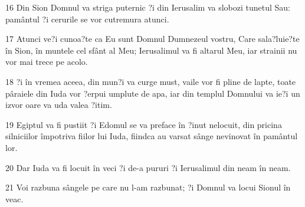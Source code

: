 \par 16 Din Sion Domnul va striga puternic ?i din Ierusalim va slobozi tunetul Sau: pamântul ?i cerurile se vor cutremura atunci.
\par 17 Atunci ve?i cunoa?te ca Eu sunt Domnul Dumnezeul vostru, Care sala?luie?te în Sion, în muntele cel sfânt al Meu; Ierusalimul va fi altarul Meu, iar strainii nu vor mai trece pe acolo.
\par 18 ?i în vremea aceea, din mun?i va curge must, vaile vor fi pline de lapte, toate pâraiele din Iuda vor ?erpui umplute de apa, iar din templul Domnului va ie?i un izvor oare va uda valea ?itim.
\par 19 Egiptul va fi pustiit ?i Edomul se va preface în ?inut nelocuit, din pricina silniciilor împotriva fiilor lui Iuda, fiindca au varsat sânge nevinovat în pamântul lor.
\par 20 Dar Iuda va fi locuit în veci ?i de-a pururi ?i Ierusalimul din neam în neam.
\par 21 Voi razbuna sângele pe care nu l-am razbunat; ?i Domnul va locui Sionul în veac.


